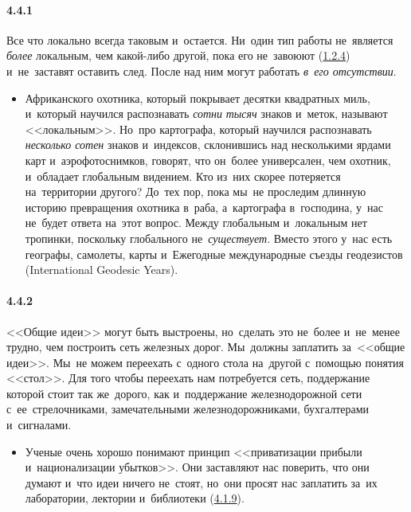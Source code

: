 \paragraph{4.4.1}\hypertarget{par:4.4.1}{} Все что локально всегда таковым и~остается. Ни~один тип работы не~является {\itshape более} локальным, чем какой-либо другой, пока его не~завоюют (\hyperlink{par:1.2.4}{1.2.4}) и~не~заставят оставить след. После над ним могут работать {\itshape в~его отсутствии}.
	\begin{itemize}
	\item 
	Африканского охотника, который покрывает десятки квадратных миль, и~который научился распознавать {\itshape сотни} {\itshape тысяч} знаков и~меток, называют <<локальным>>. Но~про картографа, который научился распознавать {\itshape несколько сотен} знаков и~индексов, склонившись над несколькими ярдами карт и~аэрофотоснимков, говорят, что он~более универсален, чем охотник, и~обладает глобальным видением. Кто из~них скорее потеряется на~территории другого? До~тех пор, пока мы~не проследим длинную историю превращения охотника в~раба, а~картографа в~господина, у~нас не~будет ответа на~этот вопрос. Между глобальным и~локальным нет тропинки, поскольку глобального не~{\itshape существует}. Вместо этого у~нас есть географы, самолеты, карты и~Ежегодные международные съезды геодезистов (International Geodesic Years).
	\end{itemize}	


\paragraph{4.4.2}\hypertarget{par:4.4.2}{} <<Общие идеи>> могут быть выстроены, но~сделать это не~более и~не~менее трудно, чем построить сеть железных дорог. Мы~должны заплатить за~<<общие идеи>>. Мы~не можем переехать с~одного стола на~другой с~помощью понятия <<стол>>. Для того чтобы переехать нам потребуется сеть, поддержание которой стоит так же~дорого, как и~поддержание железнодорожной сети с~ее~стрелочниками, замечательными железнодорожниками, бухгалтерами и~сигналами. 
	\begin{itemize}
	\item 
	Ученые очень хорошо понимают принцип <<приватизации прибыли и~национализации убытков>>. Они заставляют нас поверить, что они думают и~что идеи ничего не~стоят, но~они просят нас заплатить за~их лаборатории, лектории и~библиотеки (\hyperlink{par:4.1.9}{4.1.9}).
	\end{itemize}	


